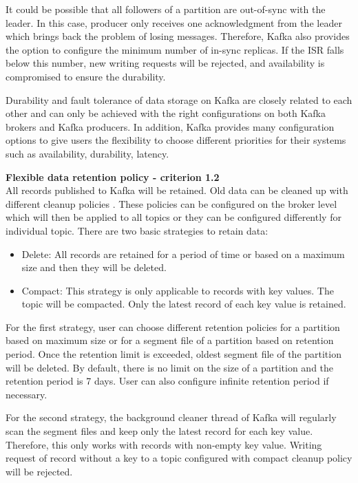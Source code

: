 It could be possible that all followers of a partition are out-of-sync with the leader. In this case, producer only receives one acknowledgment from the leader which brings back the problem of losing messages. Therefore, Kafka also provides the option to configure the minimum number of in-sync replicas. If the ISR falls below this number, new writing requests will be rejected, and availability is compromised to ensure the durability.

Durability and fault tolerance of data storage on Kafka are closely related to each other and can only be achieved with the right configurations on both Kafka brokers and Kafka producers. In addition, Kafka provides many configuration options to give users the flexibility to choose different priorities for their systems such as availability, durability, latency. 

\textbf{Flexible data retention policy - criterion 1.2}\\
All records published to Kafka will be retained. Old data can be cleaned up with different cleanup policies \cite{kafkadocumentation}. These policies can be configured on the broker level which will then be applied to all topics or they can be configured differently for individual topic. There are two basic strategies to retain data:
\begin{itemize}
	\item Delete: All records are retained for a period of time or based on a maximum size and then they will be deleted.
	\item Compact: This strategy is only applicable to records with key values. The topic will be compacted. Only the latest record of each key value is retained.
\end{itemize}

For the first strategy, user can choose different retention policies for a partition based on maximum size or for a segment file of a partition based on retention period. Once the retention limit is exceeded, oldest segment file of the partition will be deleted. By default, there is no limit on the size of a partition and the retention period is 7 days. User can also configure infinite retention period if necessary.

For the second strategy, the background cleaner thread of Kafka will regularly scan the segment files and keep only the latest record for each key value. Therefore, this only works with records with non-empty key value. Writing request of record without a key to a topic configured with compact cleanup policy will be rejected.

